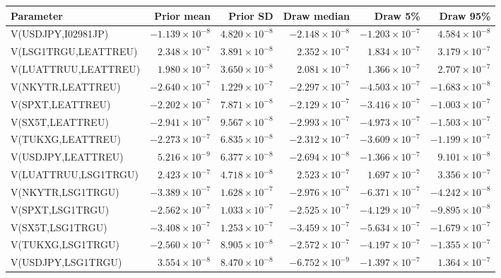 \documentclass[10pt,a4paper]{article}
\begin{document}
\begin{tabular*}{\linewidth}{@{\extracolsep{\fill}}lrrrrr@{}}
\toprule
Parameter & Prior mean & Prior SD & Draw median & Draw 5\% & Draw 95\%\\
\midrule
V(USDJPY,I02981JP) & $-1.139\times10^{-8}$ & $4.820\times10^{-8}$ & $-2.148\times10^{-8}$ & $-1.203\times10^{-7}$ & $4.584\times10^{-8}$ \\
V(LSG1TRGU,LEATTREU) & $2.348\times10^{-7}$ & $3.891\times10^{-8}$ & $2.352\times10^{-7}$ & $1.834\times10^{-7}$ & $3.179\times10^{-7}$ \\
V(LUATTRUU,LEATTREU) & $1.980\times10^{-7}$ & $3.650\times10^{-8}$ & $2.081\times10^{-7}$ & $1.366\times10^{-7}$ & $2.707\times10^{-7}$ \\
V(NKYTR,LEATTREU) & $-2.640\times10^{-7}$ & $1.229\times10^{-7}$ & $-2.297\times10^{-7}$ & $-4.503\times10^{-7}$ & $-1.683\times10^{-8}$ \\
V(SPXT,LEATTREU) & $-2.202\times10^{-7}$ & $7.871\times10^{-8}$ & $-2.129\times10^{-7}$ & $-3.416\times10^{-7}$ & $-1.003\times10^{-7}$ \\
V(SX5T,LEATTREU) & $-2.941\times10^{-7}$ & $9.567\times10^{-8}$ & $-2.993\times10^{-7}$ & $-4.973\times10^{-7}$ & $-1.503\times10^{-7}$ \\
V(TUKXG,LEATTREU) & $-2.273\times10^{-7}$ & $6.835\times10^{-8}$ & $-2.312\times10^{-7}$ & $-3.609\times10^{-7}$ & $-1.199\times10^{-7}$ \\
V(USDJPY,LEATTREU) & $5.216\times10^{-9}$ & $6.377\times10^{-8}$ & $-2.694\times10^{-8}$ & $-1.366\times10^{-7}$ & $9.101\times10^{-8}$ \\
V(LUATTRUU,LSG1TRGU) & $2.423\times10^{-7}$ & $4.718\times10^{-8}$ & $2.523\times10^{-7}$ & $1.697\times10^{-7}$ & $3.356\times10^{-7}$ \\
V(NKYTR,LSG1TRGU) & $-3.389\times10^{-7}$ & $1.628\times10^{-7}$ & $-2.976\times10^{-7}$ & $-6.371\times10^{-7}$ & $-4.242\times10^{-8}$ \\
V(SPXT,LSG1TRGU) & $-2.562\times10^{-7}$ & $1.033\times10^{-7}$ & $-2.525\times10^{-7}$ & $-4.129\times10^{-7}$ & $-9.895\times10^{-8}$ \\
V(SX5T,LSG1TRGU) & $-3.408\times10^{-7}$ & $1.253\times10^{-7}$ & $-3.459\times10^{-7}$ & $-5.634\times10^{-7}$ & $-1.679\times10^{-7}$ \\
V(TUKXG,LSG1TRGU) & $-2.560\times10^{-7}$ & $8.905\times10^{-8}$ & $-2.572\times10^{-7}$ & $-4.197\times10^{-7}$ & $-1.355\times10^{-7}$ \\
V(USDJPY,LSG1TRGU) & $3.554\times10^{-8}$ & $8.470\times10^{-8}$ & $-6.752\times10^{-9}$ & $-1.397\times10^{-7}$ & $1.364\times10^{-7}$ \\

\end{tabular*}
\end{document}
